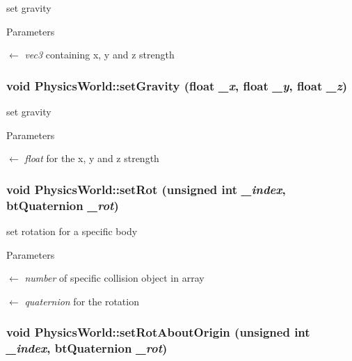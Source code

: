set gravity 
\begin{DoxyParams}{Parameters}
\item[\mbox{$\leftarrow$} {\em vec3}]containing x, y and z strength \end{DoxyParams}
\hypertarget{classPhysicsWorld_a0d04a6ac71656dbaa41394b3bfe9e4be}{
\subsubsection[{setGravity}]{\setlength{\rightskip}{0pt plus 5cm}void PhysicsWorld::setGravity (float {\em \_\-x}, \/  float {\em \_\-y}, \/  float {\em \_\-z})}}
\label{classPhysicsWorld_a0d04a6ac71656dbaa41394b3bfe9e4be}


set gravity 
\begin{DoxyParams}{Parameters}
\item[\mbox{$\leftarrow$} {\em float}]for the x, y and z strength \end{DoxyParams}
\hypertarget{classPhysicsWorld_abfbb11f5d5222deea4306838b2fb7c5e}{
\subsubsection[{setRot}]{\setlength{\rightskip}{0pt plus 5cm}void PhysicsWorld::setRot (unsigned int {\em \_\-index}, \/  btQuaternion {\em \_\-rot})}}
\label{classPhysicsWorld_abfbb11f5d5222deea4306838b2fb7c5e}


set rotation for a specific body 
\begin{DoxyParams}{Parameters}
\item[\mbox{$\leftarrow$} {\em number}]of specific collision object in array \item[\mbox{$\leftarrow$} {\em quaternion}]for the rotation \end{DoxyParams}
\hypertarget{classPhysicsWorld_aba35e36f54d2898d83b9fb57a1d00462}{
\subsubsection[{setRotAboutOrigin}]{\setlength{\rightskip}{0pt plus 5cm}void PhysicsWorld::setRotAboutOrigin (unsigned int {\em \_\-index}, \/  btQuaternion {\em \_\-rot})}}
\label{classPhysicsWorld_aba35e36f54d2898d83b9fb57a1d00462}


